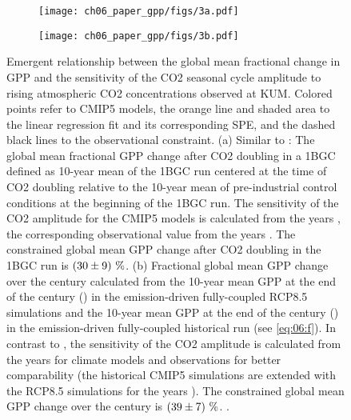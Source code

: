 \begin{figure}[t]
  \centering
  \begin{subfigure}[b]{0.37\columnwidth}
    \texttt{[image: ch06\_paper\_gpp/figs/3a.pdf]}
    \caption{}
    \label{fig:06:step1:a}
  \end{subfigure}
  \begin{subfigure}[b]{0.37\columnwidth}
    \texttt{[image: ch06\_paper\_gpp/figs/3b.pdf]}
    \caption{}
    \label{fig:06:step1:b}
  \end{subfigure}
  \begin{subfigure}[b]{0.24\columnwidth}
  \end{subfigure}
  \caption[
    Emergent relationship between the global mean fractional change in
    \acf{GPP} and the sensitivity of the \acs{CO2} seasonal cycle amplitude to
    rising atmospheric \acs{CO2} concentrations observed at \acl{KUM}.
  ]{
    Emergent relationship between the global mean fractional change in
    \acf{GPP} and the sensitivity of the \acs{CO2} seasonal cycle amplitude to
    rising atmospheric \acs{CO2} concentrations observed at \acf{KUM}. Colored
    points refer to \acs{CMIP}5 models, the orange line and shaded area to the
    linear regression fit and its corresponding \acl{SPE}, and the dashed black
    lines to the observational constraint. (a) Similar to
    \textcite{Wenzel2016}: The global mean fractional \acs{GPP} change after
    \acs{CO2} doubling in a \acf{1BGC} defined as 10-year mean of the
    \acs{1BGC} run centered at the time of \acs{CO2} doubling relative to the
    10-year mean of pre-industrial control conditions at the beginning of the
    \acs{1BGC} run. The sensitivity of the \acs{CO2} amplitude for the
    \acs{CMIP}5 models is calculated from the years , the
    corresponding observational value from the years . The
    constrained global mean \acs{GPP} change after \acs{CO2} doubling in the
    \acs{1BGC} run is $\pmrangeunit{30}{9}{\%}$. (b) Fractional global mean
    \acs{GPP} change over the  century calculated from the 10-year mean
    \acs{GPP} at the end of the  century () in the
    emission-driven fully-coupled \acs{RCP}8.5 simulations and the 10-year mean
    \acs{GPP} at the end of the  century () in the
    emission-driven fully-coupled historical run (see \cref{eq:06:f}). In
    contrast to \textcite{Wenzel2016}, the sensitivity of the \acs{CO2}
    amplitude is calculated from the years  for climate
    models and observations for better comparability (the historical
    \acs{CMIP}5 simulations are extended with the \acs{RCP}8.5 simulations for
    the years ). The constrained global mean \acs{GPP} change
    over the  century is $\pmrangeunit{39}{7}{\%}$.
    .
  }
  \label{fig:06:step1}
\end{figure}

